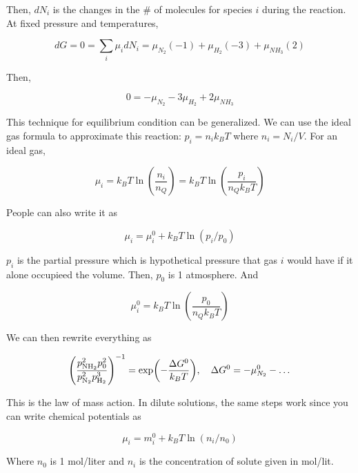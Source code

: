 \documentclass{article}
\newtheorem{one minute paper}[theorem]{One Minute Paper}
\begin{document}
Then, $dN_i$ is the changes in the \# of molecules for species $i$ during the reaction. At fixed pressure and temperatures, 

\begin{equation}
    dG = 0 = \sum_i \mu_i dN_i = \mu_{N_2}(-1) + \mu_{H_2}(-3) + \mu_{NH_3}(2) 
\end{equation}

Then,  

\begin{equation}
    0 = -\mu_{N_2} - 3\mu_{H_2} + 2\mu_{NH_3}
\end{equation}

This technique for equilibrium condition can be generalized. We can use the ideal gas formula to approximate this reaction: $p_i = n_i k_B T$ where $n_i = N_i/V$. For an ideal gas, 

\begin{equation}
    \mu_i = k_B T\ln\left( \frac{n_i}{n_Q} \right) = k_B T \ln\left( \frac{p_i}{n_Q k_B T} \right)
\end{equation}

People can also write it as 

\begin{equation}
    \mu_i = \mu^0_i + k_B T \ln\left( p_i/p_0 \right)
\end{equation}

$p_i$ is the partial pressure which is hypothetical pressure that gas $i$ would have if it alone occupieed the volume. Then, $p_0$ is 1 atmosphere. And 

\begin{equation}
    \mu^0_i = k_B T \ln\left( \frac{p_0}{n_Q k_B T} \right)
\end{equation}

We can then rewrite everything as 

\begin{equation}
    \left( \frac{p_{\rm NH_2}^2 p_0^2}{p_{\rm N_2}^2p_{\rm H_2}^3} \right)^{-1} = \exp(-\frac{\Delta G^0}{k_B T}), \quad \Delta G^0 = -\mu_{N_2}^0 - \dots
\end{equation}

This is the law of mass action. In dilute solutions, the same steps work since you can write chemical potentials as 

\begin{equation}
    \mu_i = m^0_i + k_B T \ln(n_i/n_0)
\end{equation}

Where $n_0$ is 1 mol/liter and $n_i$ is the concentration of solute given in mol/lit. 
\end{document}
